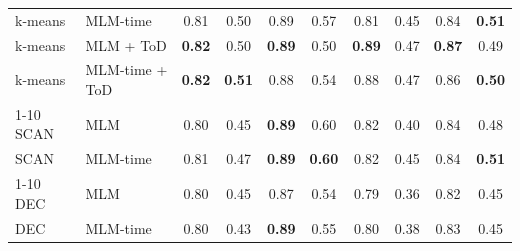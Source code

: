 \begin{table}[t]
\begin{tabular}{llcccccc|cc}
k-means & MLM-time & 0.81 & 0.50 & 0.89 & 0.57 & 0.81 & 0.45 & 0.84 & \textbf{0.51} \\
k-means & MLM + ToD & \textbf{0.82} & 0.50 & \textbf{0.89} & 0.50 & \textbf{0.89} & 0.47 & \textbf{0.87} & 0.49 \\
k-means & MLM-time + ToD & \textbf{0.82} & \textbf{0.51} & 0.88 & 0.54 & 0.88 & 0.47 & 0.86 & \textbf{0.50} \\
\cmidrule{1-10}
SCAN & MLM & 0.80 & 0.45 & \textbf{0.89} & 0.60 & 0.82 & 0.40 & 0.84 & 0.48 \\
SCAN & MLM-time & 0.81 & 0.47 & \textbf{0.89} & \textbf{0.60} & 0.82 & 0.45 & 0.84 & \textbf{0.51} \\
\cmidrule{1-10}
DEC & MLM & 0.80 & 0.45 & 0.87 & 0.54 & 0.79 & 0.36 & 0.82 & 0.45 \\
DEC & MLM-time & 0.80 & 0.43 & \textbf{0.89} & 0.55 & 0.80 & 0.38 & 0.83 & 0.45 \\
\bottomrule
\end{tabular}
\end{table}

